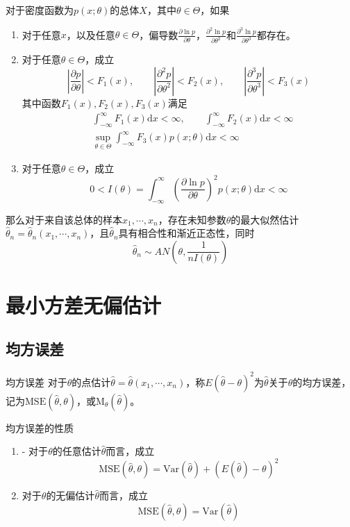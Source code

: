 \documentclass[lang = cn, scheme = chinese, thmcnt = section]{elegantbook}
\begin{document}
\begin{theorem}
	对于密度函数为$p(x;\theta)$的总体$X$，其中$\theta\in\Theta$，如果
	\begin{enumerate}
		\item 对于任意$x$，以及任意$\theta\in\Theta$，偏导数$\frac{\partial \ln{p}}{\partial \theta}$，$\frac{\partial^2 \ln{p}}{\partial \theta^2}$和$\frac{\partial^3 \ln{p}}{\partial \theta^3}$都存在。
		\item 对于任意$\theta\in\Theta$，成立
		$$
		\left| \frac{\partial p}{\partial \theta} \right|<F_1(x),\qquad 
		\left| \frac{\partial^2 p}{\partial \theta^2} \right|<F_2(x),\qquad 
		\left| \frac{\partial^3 p}{\partial \theta^3} \right|<F_3(x)
		$$
		其中函数$F_1(x),F_2(x),F_3(x)$满足
		\begin{align*}
			& \int_{-\infty}^{\infty}{F_1(x)\mathrm{d}x}<\infty,\qquad
			\int_{-\infty}^{\infty}{F_2(x)\mathrm{d}x}<\infty\\
			& \sup_{\theta\in\Theta}{\int_{-\infty}^{\infty}{F_3(x)p(x;\theta)\mathrm{d}x}}<\infty
		\end{align*}
		\item 对于任意$\theta\in\Theta$，成立
		$$
		0<I(\theta)=\int_{-\infty}^{\infty}{\left(\frac{\partial \ln{p}}{\partial \theta}\right)^2p(x;\theta)\mathrm{d}x}<\infty
		$$
	\end{enumerate}
	那么对于来自该总体的样本$x_1,\cdots,x_n$，存在未知参数$\theta$的最大似然估计$\hat{\theta}_n=\hat{\theta}_n(x_1,\cdots,x_n)$，且$\hat{\theta}_n$具有相合性和渐近正态性，同时
	$$
	\hat{\theta}_n\sim AN\left(\theta,\frac{1}{n I(\theta)}\right)
	$$
\end{theorem}

\section{最小方差无偏估计}

\subsection{均方误差}

\begin{definition}{均方误差}
	对于$\theta$的点估计$\hat{\theta}=\hat{\theta}(x_1,\cdots,x_n)$，称$E( \hat{\theta}-\theta)^2$为$\hat{\theta}$关于$\theta$的均方误差，记为$\mathrm{MSE}(\hat{\theta},\theta)$，或$\mathrm{M}_{\theta}(\hat{\theta})$。
\end{definition}

\begin{proposition}{均方误差的性质}
	\begin{enumerate}
		\item - 对于$\theta$的任意估计$\hat{\theta}$而言，成立
		$$
		\mathrm{MSE}(\hat{\theta},\theta)=\mathrm{Var}(\hat{\theta})+( E(\hat{\theta})-\theta )^2
		$$
		\item 对于$\theta$的无偏估计$\hat{\theta}$而言，成立
		$$
		\mathrm{MSE}(\hat{\theta},\theta)=\mathrm{Var}(\hat{\theta})
		$$
	\end{enumerate}
\end{proposition}
\end{document}
